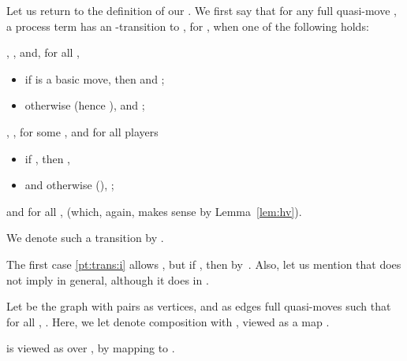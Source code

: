 \documentclass{LMCS}
\theoremstyle{plain}\newtheorem{satz}[thm]{Satz}
\begin{document}
Let us return to the definition of our \lts{}. 
We first say that for any full quasi-move , a
process term  has an -transition to , for , when
one of the following holds:
\begin{enumeratei}
\item \label{pt:trans:i}  , , and, for all ,
  \begin{itemize}
  \item if  is a basic move, then  and ;
  \item otherwise  (hence ), and ;
  \end{itemize}
\item , ,  for some , and for all players 
  \begin{itemize}
  \item if , then 
    ,
  \item and otherwise (),  ;
  \end{itemize}

\item  
  and for all ,  (which, again,
  makes sense by Lemma~\ref{lem:hv}).
\end{enumeratei}
We denote such a transition by .
\begin{rem}
  The first case \ref{pt:trans:i} allows , but
  if , then 
  by~. Also, let us mention that  does not imply  in general, although it
  does in .
\end{rem}

\begin{defi}
Let  be the graph with pairs  as vertices, and as
edges  full quasi-moves  such
that for all , . Here, we let  denote
composition with , viewed as a map .

   is viewed as \anlts{} over , by mapping  to .
\end{defi}
\end{document}
